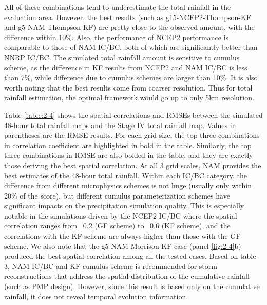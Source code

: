 All of these combinations tend to underestimate the total rainfall in the evaluation area. However, the best results (such as g15-NCEP2-Thompson-KF and g5-NAM-Thompson-KF) are pretty close to the observed amount, with the difference within 10\%. Also, the performance of NCEP2 performance is comparable to those of NAM IC/BC, both of which are significantly better than NNRP IC/BC. The simulated total rainfall amount is sensitive to cumulus scheme, as the difference in KF results from NCEP2 and NAM IC/BC is less than 7\%, while difference due to cumulus schemes are larger than 10\%. It is also worth noting that the best results come from coarser resolution. Thus for total rainfall estimation, the optimal framework would go up to only 5km resolution.

Table \ref{table:2-4} shows the spatial correlations and RMSEs between the simulated 48-hour total rainfall maps and the Stage IV total rainfall map. Values in parentheses are the RMSE results. For each grid size, the top three combinations in correlation coefficient are highlighted in bold in the table. Similarly, the top three combinations in RMSE are also bolded in the table, and they are exactly those deriving the best spatial correlation. At all 3 grid scales, NAM provides the best estimates of the 48-hour total rainfall. Within each IC/BC category, the difference from different microphysics schemes is not huge (usually only within 20\% of the score), but different cumulus parameterization schemes have significant impacts on the precipitation simulation quality. This is especially notable in the simulations driven by the NCEP2 IC/BC where the spatial correlation ranges from ~0.2 (GF scheme) to ~0.6 (KF scheme), and the correlations with the KF scheme are always higher than those with the GF scheme. We also note that the g5-NAM-Morrison-KF case (panel \ref{fig:2-4}b) produced the best spatial correlation among all the tested cases. Based on table 3, NAM IC/BC and KF cumulus scheme is recommended for storm reconstructions that address the spatial distribution of the cumulative rainfall (such as PMP design). However, since this result is based only on the cumulative rainfall, it does not reveal temporal evolution information.

